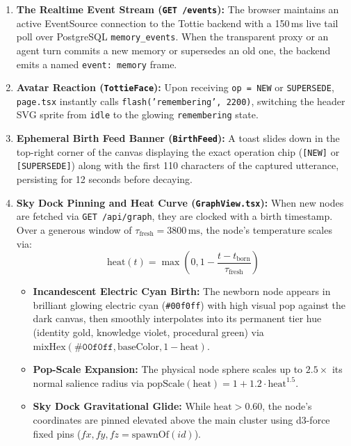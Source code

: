 \begin{enumerate}
  \item \textbf{The Realtime Event Stream (\texttt{GET /events}):}
  The browser maintains an active EventSource connection to the Tottie backend with a 150\,ms live
  tail poll over PostgreSQL \texttt{memory\_events}. When the transparent proxy or an agent turn
  commits a new memory or supersedes an old one, the backend emits a named \texttt{event: memory} frame.
  \item \textbf{Avatar Reaction (\texttt{TottieFace}):}
  Upon receiving \texttt{op = NEW} or \texttt{SUPERSEDE}, \texttt{page.tsx} instantly calls
  \texttt{flash('remembering', 2200)}, switching the header SVG sprite from \texttt{idle} to the glowing
  \texttt{remembering} state.
  \item \textbf{Ephemeral Birth Feed Banner (\texttt{BirthFeed}):}
  A toast slides down in the top-right corner of the canvas displaying the exact operation chip
  (\texttt{[NEW]} or \texttt{[SUPERSEDE]}) along with the first 110 characters of the captured utterance,
  persisting for 12 seconds before decaying.
  \item \textbf{Sky Dock Pinning and Heat Curve (\texttt{GraphView.tsx}):}
  When new nodes are fetched via \texttt{GET /api/graph}, they are clocked with a birth timestamp.
  Over a generous window of $\tau_{\text{fresh}} = 3800\,\text{ms}$, the node's temperature scales via:
  \begin{equation}
    \text{heat}(t) = \max\left(0, 1 - \frac{t - t_{\text{born}}}{\tau_{\text{fresh}}}\right)
  \end{equation}
  \begin{itemize}
    \item \textbf{Incandescent Electric Cyan Birth:} The newborn node appears in brilliant glowing
    electric cyan (\texttt{\#00f0ff}) with high visual pop against the dark canvas, then smoothly
    interpolates into its permanent tier hue (identity gold, knowledge violet, procedural green)
    via $\text{mixHex}(\texttt{\#00f0ff}, \text{baseColor}, 1 - \text{heat})$.
    \item \textbf{Pop-Scale Expansion:} The physical node sphere scales up to $2.5\times$ its normal salience
    radius via $\text{popScale}(\text{heat}) = 1 + 1.2 \cdot \text{heat}^{1.5}$.
    \item \textbf{Sky Dock Gravitational Glide:} While $\text{heat} > 0.60$, the node's coordinates are pinned
    elevated above the main cluster using d3-force fixed pins ($fx, fy, fz = \text{spawnOf}(id)$).

\end{itemize}
\end{enumerate}
